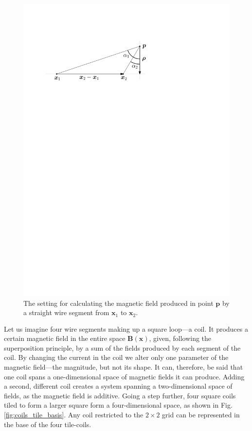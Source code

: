 \begin{figure}
  \centering
  \includegraphics[width=0.6\linewidth]{gfx/coils/biot_savart.pdf}
  \caption{The setting for calculating the magnetic field produced in point $\bm{p}$ by a straight wire segment from $\bm{x}_1$ to $\bm{x}_2$.}
  \label{fig:biot-savart}
\end{figure}

Let us imagine four wire segments making up a square loop---a coil. It produces a certain magnetic field in the entire space $\mathbf{B}(\mathbf{x})$, given, following the superposition principle, by a sum of the fields produced by each segment of the coil.
By changing the current in the coil we alter only one parameter of the magnetic field---the magnitude, but not its shape. It can, therefore, be said that one coil spans a one-dimensional space of magnetic fields it can produce. Adding a second, different coil creates a system spanning a two-dimensional space of fields, as the magnetic field is additive. Going a step further, four square coils tiled to form a larger square form a four-dimensional space, as shown in Fig.\,\ref{fig:coils_tile_basis}. Any coil restricted to the $2 \times 2$ grid can be represented in the base of the four tile-coils.

